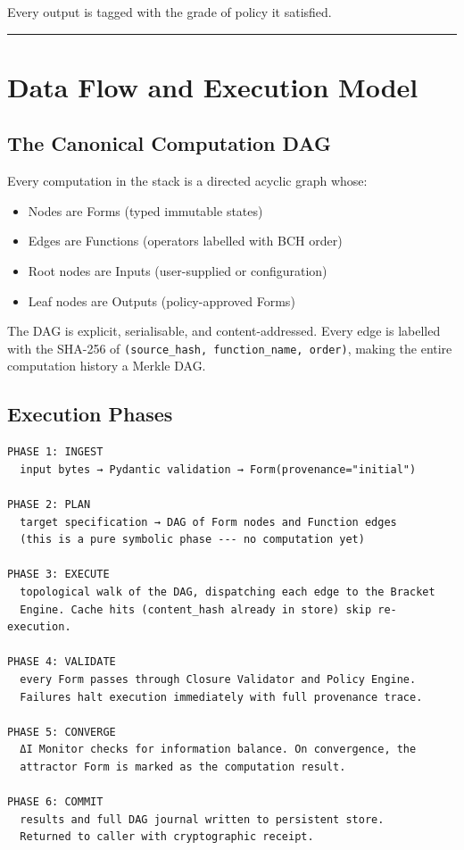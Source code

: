 \documentclass[11pt,a4paper]{article}
\providecommand{\tightlist}{\setlength{\itemsep}{0pt}\setlength{\parskip}{0pt}}
\begin{document}
Every output is tagged with the grade of policy it satisfied.

\begin{center}\rule{0.5\linewidth}{0.5pt}\end{center}

\hypertarget{data-flow-and-execution-model}{%
\section{Data Flow and Execution
Model}\label{data-flow-and-execution-model}}

\hypertarget{the-canonical-computation-dag}{%
\subsection{The Canonical Computation
DAG}\label{the-canonical-computation-dag}}

Every computation in the stack is a directed acyclic graph whose:

\begin{itemize}
\tightlist
\item
  Nodes are Forms (typed immutable states)
\item
  Edges are Functions (operators labelled with BCH order)
\item
  Root nodes are Inputs (user-supplied or configuration)
\item
  Leaf nodes are Outputs (policy-approved Forms)
\end{itemize}

The DAG is explicit, serialisable, and content-addressed. Every edge is
labelled with the SHA-256 of
\texttt{(source\_hash,\ function\_name,\ order)}, making the entire
computation history a Merkle DAG.

\hypertarget{execution-phases}{%
\subsection{Execution Phases}\label{execution-phases}}

\begin{Verbatim}[breaklines=true,breakanywhere=true]
PHASE 1: INGEST
  input bytes → Pydantic validation → Form(provenance="initial")

PHASE 2: PLAN
  target specification → DAG of Form nodes and Function edges
  (this is a pure symbolic phase --- no computation yet)

PHASE 3: EXECUTE
  topological walk of the DAG, dispatching each edge to the Bracket
  Engine. Cache hits (content_hash already in store) skip re-execution.

PHASE 4: VALIDATE
  every Form passes through Closure Validator and Policy Engine.
  Failures halt execution immediately with full provenance trace.

PHASE 5: CONVERGE
  ΔI Monitor checks for information balance. On convergence, the
  attractor Form is marked as the computation result.

PHASE 6: COMMIT
  results and full DAG journal written to persistent store.
  Returned to caller with cryptographic receipt.
\end{Verbatim}
\end{document}
